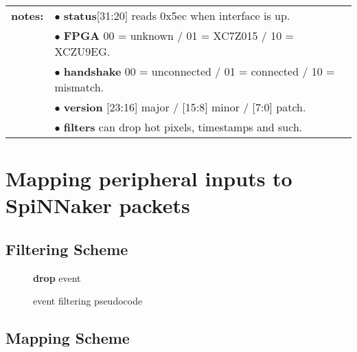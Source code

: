 \documentclass[11pt,a4paper,twoside]{article}
\begin{document}
\begin{center}
	\begin{tabularx}{\textwidth}{| l X |}
		\hline
		\textbf{notes:} & $\bullet$ \textbf{status}[31:20] reads 0x5ec when interface is up.              \\%
		                & $\bullet$ \textbf{FPGA} 00 = unknown / 01 = XC7Z015 / 10 = XCZU9EG.             \\%
		                & $\bullet$ \textbf{handshake} 00 = unconnected / 01 = connected / 10 = mismatch. \\%
		                & $\bullet$ \textbf{version} [23:16] major / [15:8] minor / [7:0] patch.          \\%
		                & $\bullet$ \textbf{filters} can drop hot pixels, timestamps and such.            \\%
		\hline
	\end{tabularx}
\end{center}


\clearpage
\section{Mapping peripheral inputs to SpiNNaker packets}


\subsection{Filtering Scheme}


\begin{figure}[!ht]
	\centering
	\begin{minipage}{0.95\columnwidth}
		\begin{algorithm}[H]
			\caption{event filtering pseudocode}
			\begin{algorithmic}[1]
						\State \textbf{drop} event
					\EndIf
				\EndFor
			\end{algorithmic}
			\label{alg:filter}
		\end{algorithm}
	\end{minipage}
\end{figure}


\subsection{Mapping Scheme}
\end{document}
